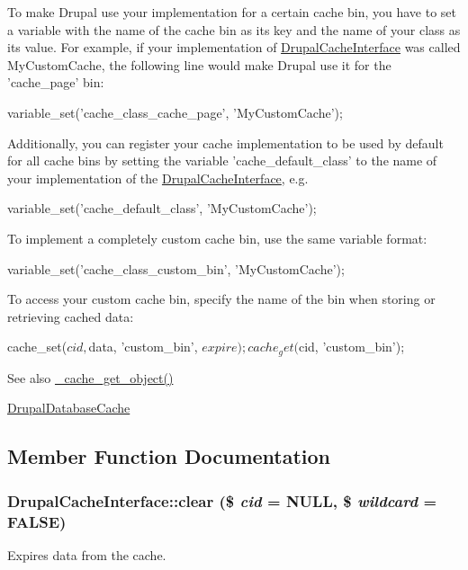 To make Drupal use your implementation for a certain cache bin, you have to set a variable with the name of the cache bin as its key and the name of your class as its value. For example, if your implementation of \hyperlink{interfaceDrupalCacheInterface}{DrupalCacheInterface} was called MyCustomCache, the following line would make Drupal use it for the 'cache\_\-page' bin: 
\begin{DoxyCode}
  variable_set('cache_class_cache_page', 'MyCustomCache');
\end{DoxyCode}


Additionally, you can register your cache implementation to be used by default for all cache bins by setting the variable 'cache\_\-default\_\-class' to the name of your implementation of the \hyperlink{interfaceDrupalCacheInterface}{DrupalCacheInterface}, e.g. 
\begin{DoxyCode}
  variable_set('cache_default_class', 'MyCustomCache');
\end{DoxyCode}


To implement a completely custom cache bin, use the same variable format: 
\begin{DoxyCode}
  variable_set('cache_class_custom_bin', 'MyCustomCache');
\end{DoxyCode}
 To access your custom cache bin, specify the name of the bin when storing or retrieving cached data: 
\begin{DoxyCode}
  cache_set($cid, $data, 'custom_bin', $expire);
  cache_get($cid, 'custom_bin');
\end{DoxyCode}


\begin{DoxySeeAlso}{See also}
\hyperlink{includes_2cache_8inc_aebc44cd35cb38b264cf0b07a164ee1af}{\_\-cache\_\-get\_\-object()} 

\hyperlink{classDrupalDatabaseCache}{DrupalDatabaseCache} 
\end{DoxySeeAlso}


\subsection{Member Function Documentation}
\hypertarget{interfaceDrupalCacheInterface_a5c8e341f653337185feff4ddc30c1b48}{
\subsubsection[{clear}]{\setlength{\rightskip}{0pt plus 5cm}DrupalCacheInterface::clear (\$ {\em cid} = {\ttfamily NULL}, \/  \$ {\em wildcard} = {\ttfamily FALSE})}}
\label{interfaceDrupalCacheInterface_a5c8e341f653337185feff4ddc30c1b48}
Expires data from the cache.

